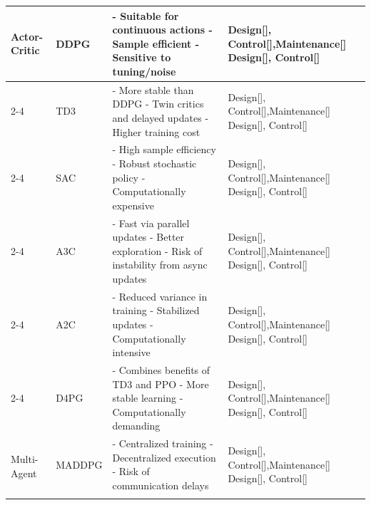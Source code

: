 \begin{table}[t]
\begin{tabular}{|l|l|p{8.2cm}|p{4.2cm}|}
\multirow{8}{*}{Actor-Critic}
& DDPG & 
- Suitable for continuous actions \newline
- Sample efficient \newline
- Sensitive to tuning/noise 
& Design[], Control[],Maintenance[] \newline
Design[], Control[]
\\
\cline{2-4}

& TD3 & 
- More stable than DDPG \newline
- Twin critics and delayed updates \newline
- Higher training cost 
& Design[], Control[],Maintenance[] \newline
Design[], Control[]
\\
\cline{2-4}

& SAC & 
- High sample efficiency \newline
- Robust stochastic policy \newline
- Computationally expensive 
& Design[], Control[],Maintenance[] \newline
Design[], Control[]
\\
\cline{2-4}

& A3C & 
- Fast via parallel updates \newline
- Better exploration \newline
- Risk of instability from async updates 
& Design[], Control[],Maintenance[] \newline
Design[], Control[]
\\
\cline{2-4}

& A2C & 
- Reduced variance in training \newline
- Stabilized updates \newline
- Computationally intensive 
& Design[], Control[],Maintenance[] \newline
Design[], Control[]
\\
\cline{2-4}

& D4PG & 
- Combines benefits of TD3 and PPO \newline
- More stable learning \newline
- Computationally demanding 
& Design[], Control[],Maintenance[] \newline
Design[], Control[]
\\
\hline

\multirow{4}{*}{Multi-Agent}
& MADDPG & 
- Centralized training \newline
- Decentralized execution \newline
- Risk of communication delays 
& Design[], Control[],Maintenance[] \newline
Design[], Control[]
\\
\cline{2-4}


\end{tabular}
\end{table}
